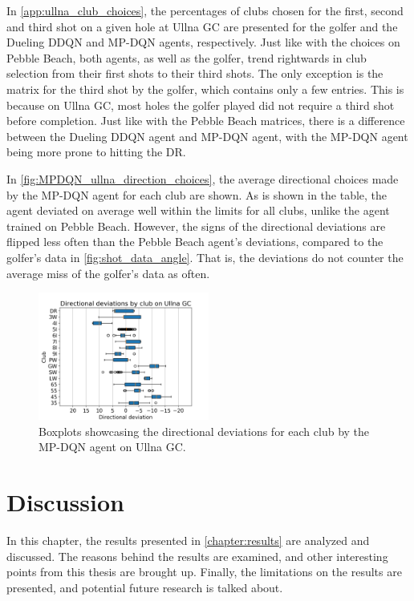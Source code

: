 \documentclass{kththesis}
\begin{document}
In \autoref{app:ullna_club_choices}, the percentages of clubs chosen for the first, second and third shot on a given hole at Ullna GC are presented for the golfer and the Dueling DDQN and MP-DQN agents, respectively. Just like with the choices on Pebble Beach, both agents, as well as the golfer, trend rightwards in club selection from their first shots to their third shots. The only exception is the matrix for the third shot by the golfer, which contains only a few entries. This is because on Ullna GC, most holes the golfer played did not require a third shot before completion. Just like with the Pebble Beach matrices, there is a difference between the Dueling DDQN agent and MP-DQN agent, with the MP-DQN agent being more prone to hitting the DR.

In \autoref{fig:MPDQN_ullna_direction_choices}, the average directional choices made by the MP-DQN agent for each club are shown. As is shown in the table, the agent deviated on average well within the limits for all clubs, unlike the agent trained on Pebble Beach. However, the signs of the directional deviations are flipped less often than the Pebble Beach agent's deviations, compared to the golfer's data in \autoref{fig:shot_data_angle}. That is, the deviations do not counter the average miss of the golfer's data as often.

\begin{figure}
    \centering
    \includegraphics[width=0.5\textwidth]{Boxplots/MPDQN_Ullna_directions.png}
    \caption{Boxplots showcasing the directional deviations for each club by the MP-DQN agent on Ullna GC.}
    \label{fig:MPDQN_ullna_direction_choices}
\end{figure}

\chapter{Discussion}
\label{chapter:discussion}
In this chapter, the results presented in \autoref{chapter:results} are analyzed and discussed. The reasons behind the results are examined, and other interesting points from this thesis are brought up. Finally, the limitations on the results are presented, and potential future research is talked about.
\end{document}
